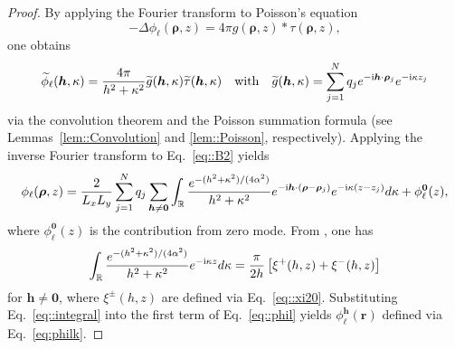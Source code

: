 \begin{proof}
	By applying the Fourier transform to Poisson's equation
	\begin{equation}\label{eq::B.1}
		-\Delta\phi_{\ell}(\bm{\rho},z)=4\pi g(\bm{\rho},z)\ast\tau(\bm{\rho},z),
	\end{equation}
	one obtains  
	\begin{equation}\label{eq::B2}
		\widetilde{\phi}_{\ell}(\bm{h},\kappa)=\frac{4\pi}{h^2+\kappa^2}\widetilde{g}(\bm{h},\kappa)\widetilde{\tau}(\bm{h},\kappa)\quad\text{with}\quad \widetilde{g}(\bm{h},\kappa)=\sum_{j=1}^{N}q_{j} e^{-\mathrm{i} \bm{h}\cdot\bm{\rho}_{j}}e^{-\mathrm{i} \kappa z_{j}}
	\end{equation}
	via the convolution theorem and the Poisson summation formula (see Lemmas~\ref{lem::Convolution} and \ref{lem::Poisson}, respectively). Applying the inverse Fourier transform to Eq.~\eqref{eq::B2} yields
	\begin{equation}\label{eq::phil}
		\phi_{\ell}(\bm{\rho},z)=\frac{2}{L_xL_y}\sum_{j=1}^{N}q_{j}\sum_{\bm{h}\neq\bm{0}}\int_{\mathbb{R}}\frac{e^{-(h^2+\kappa^2)/(4\alpha^2)}}{h^2+\kappa^2}e^{-\mathrm{i} \bm{h}\cdot(\bm{\rho}-\bm{\rho}_{j})}e^{-\mathrm{i} \kappa(z-z_{j})}d\kappa + \phi^{\bm{0}}_{\ell}(z),
	\end{equation}
	where $\phi^{\bm{0}}_{\ell}(z)$ is the contribution from zero mode. From \cite{oberhettinger2012tables}, one has 
	\begin{equation}\label{eq::integral}
		\int_{\mathbb{R}} \frac{e^{-(h^2+\kappa^2)/(4\alpha^2)}}{h^2+\kappa^2} e^{-\mathrm{i} \kappa z} d\kappa = \frac{\pi}{2h} \left[\xi^{+}(h,z)+\xi^{-}(h,z)\right]
	\end{equation}
	for $\bm{h}\neq\bm{0}$, where $\xi^{\pm}(h,z)$ are defined via Eq.~\eqref{eq::xi20}. Substituting Eq.~\eqref{eq::integral} into the first term of Eq.~\eqref{eq::phil} yields $\phi_{\ell}^{\bm{h}}(\bm{r})$ defined via Eq.~\eqref{eq:philk}.


\end{proof}
